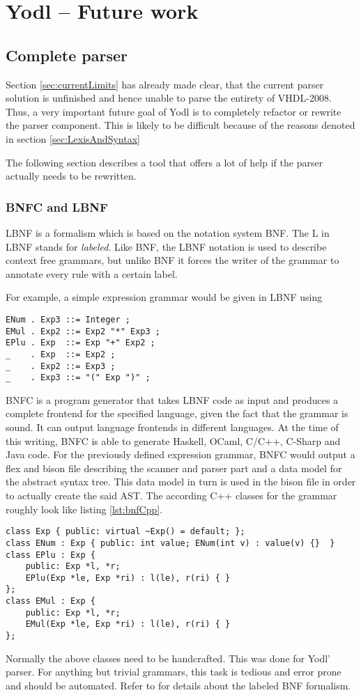 \chapter{Yodl -- Future work}
\section{Complete parser}
Section \ref{sec:currentLimits}
has already made clear, that the current parser solution is unfinished
and hence unable to parse the entirety of VHDL-2008. Thus, a very important
future goal of Yodl is to completely refactor or rewrite the parser
component. This is likely to be difficult because of the reasons
denoted in section \ref{sec:LexisAndSyntax}

The following section describes a tool that offers a lot of help if the
parser actually needs to be rewritten.

\subsection{BNFC and LBNF}
LBNF is a formalism which is based on the notation system BNF. The
L in LBNF stands for \emph{labeled}. Like BNF, the LBNF notation
is used to describe context free grammars, but unlike BNF it forces
the writer of the grammar to annotate every rule with a certain label.

For example, a simple expression grammar would be given in LBNF using
%
\begin{verbatim}
ENum . Exp3 ::= Integer ;
EMul . Exp2 ::= Exp2 "*" Exp3 ;
EPlu . Exp  ::= Exp "+" Exp2 ;
_    . Exp  ::= Exp2 ;
_    . Exp2 ::= Exp3 ;
_    . Exp3 ::= "(" Exp ")" ;
\end{verbatim}
%
BNFC is a program generator that takes LBNF code as input and produces
a complete frontend for the specified language, given the fact that
the grammar is sound. It can output language frontends in different
languages. At the time of this writing, BNFC is able to generate
Haskell, OCaml, C/C++, C-Sharp and Java code. For the previously
defined expression grammar, BNFC would output a flex and bison file
describing the scanner and parser part and a data model for the
abstract syntax tree. This data model in turn is used in the bison
file in order to actually create the said AST.
The according C++ classes for the grammar roughly look like listing
\ref{lst:bnfCpp}.
%
\begin{lstlisting}[style=c++, caption={Generated classes for
      expression grammar}, label={lst:bnfCpp}]
class Exp { public: virtual ~Exp() = default; };
class ENum : Exp { public: int value; ENum(int v) : value(v) {}  }
class EPlu : Exp {
    public: Exp *l, *r;
    EPlu(Exp *le, Exp *ri) : l(le), r(ri) { }
};
class EMul : Exp {
    public: Exp *l, *r;
    EMul(Exp *le, Exp *ri) : l(le), r(ri) { }
};
\end{lstlisting}
%
Normally the
above classes need to be handcrafted. This was done for Yodl'
parser. For anything but trivial
grammars, this task is tedious and error prone and should be
automated. Refer to \cite{LBNF} for details about the labeled BNF
formalism.

